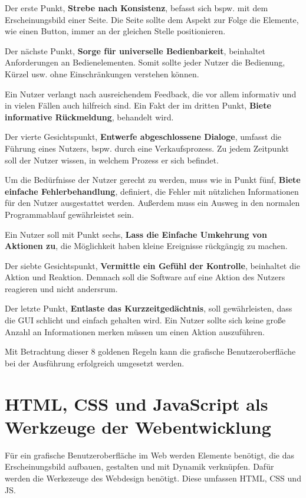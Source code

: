 \documentclass[a4paper,titlepage,halfparskip,12pt]{scrreprt}
\begin{document}
\begin{onehalfspacing}
Der erste Punkt, \textbf{Strebe nach Konsistenz}, befasst sich bspw. mit dem Erscheinungsbild einer Seite. Die Seite sollte dem Aspekt zur Folge die Elemente, wie einen Button, immer an der gleichen Stelle positionieren.

Der nächste Punkt, \textbf{Sorge für universelle Bedienbarkeit}, beinhaltet Anforderungen an Bedienelementen. Somit sollte jeder Nutzer die Bedienung, Kürzel usw. ohne Einschränkungen verstehen können.

Ein Nutzer verlangt nach ausreichendem Feedback, die vor allem informativ und in vielen Fällen auch hilfreich sind. Ein Fakt der im dritten Punkt, \textbf{Biete informative Rückmeldung}, behandelt wird.

Der vierte Gesichtspunkt, \textbf{Entwerfe abgeschlossene Dialoge}, umfasst die Führung eines Nutzers, bspw. durch eine Verkaufsprozess. Zu jedem Zeitpunkt soll der Nutzer wissen, in welchem Prozess er sich befindet.

Um die Bedürfnisse der Nutzer gerecht zu werden, muss wie in Punkt fünf, \textbf{Biete einfache Fehlerbehandlung}, definiert, die Fehler mit nützlichen Informationen für den Nutzer ausgestattet werden. Außerdem muss ein Ausweg in den normalen Programmablauf gewährleistet sein.

Ein Nutzer soll mit Punkt sechs, \textbf{Lass die Einfache Umkehrung von Aktionen zu}, die Möglichkeit haben kleine Ereignisse rückgängig zu machen.

Der siebte Gesichtspunkt, \textbf{Vermittle ein Gefühl der Kontrolle}, beinhaltet die Aktion und Reaktion. Demnach soll die Software auf eine Aktion des Nutzers reagieren und nicht andersrum. 

Der letzte Punkt, \textbf{Entlaste das Kurzzeitgedächtnis}, soll gewährleisten, dass die \ac{GUI} schlicht und einfach gehalten wird. Ein Nutzer sollte sich keine große Anzahl an Informationen merken müssen um einen Aktion auszuführen.
\cite{UI8Regeln2019}

Mit Betrachtung dieser 8 goldenen Regeln kann die grafische Benutzeroberfläche bei der Ausführung erfolgreich umgesetzt werden.


\section{HTML, CSS und JavaScript als Werkzeuge der Webentwicklung}
\label{sec:HTMLCSSJS}
Für ein grafische Benutzeroberfläche im Web werden Elemente benötigt, die das Erscheinungsbild aufbauen, gestalten und mit Dynamik verknüpfen. Dafür werden die Werkezeuge des Webdesign benötigt. Diese umfassen \ac{HTML}, \ac{CSS} und \ac{JS}.


\end{onehalfspacing}
\end{document}
